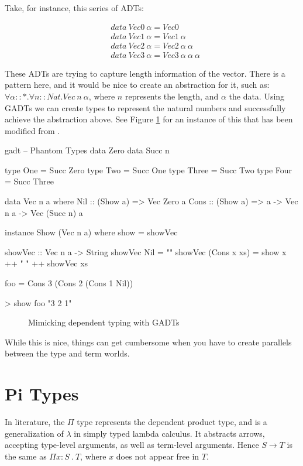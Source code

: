 Take, for instance, this series of ADTs:
\begin{spacing}{1.3}
\begin{equation*}
  \begin{aligned}
  & data\ Vec0\ \alpha = Vec0 \\
  & data\ Vec1\ \alpha = Vec1\ \alpha \\
  & data\ Vec2\ \alpha = Vec2\ \alpha\ \alpha \\
  & data\ Vec3\ \alpha = Vec3\ \alpha\ \alpha\ \alpha
  \end{aligned}
\end{equation*}
\end{spacing}

These ADTs are trying to capture length information of the vector. There is a pattern here, and it would be nice to create an abstraction for it, such as: $\forall \alpha :: \ast.\forall n :: Nat.Vec\ n\ \alpha $, where $n$ represents the length, and $\alpha $ the data.\cite{lambdaPi} Using GADTs we can create types to represent the natural numbers and successfully achieve the abstraction above. See Figure \ref{fig:gadt} for an instance of this that has been modified from \cite{vectors}.

\begin{SaveVerbatim}{gadt}
-- Phantom Types
data Zero
data Succ n

type One   = Succ Zero
type Two   = Succ One
type Three = Succ Two
type Four  = Succ Three

data Vec n a where
  Nil  :: (Show a) =>                 Vec Zero a
  Cons :: (Show a) => a -> Vec n a -> Vec (Succ n) a

instance Show (Vec n a) where show = showVec

showVec :: Vec n a -> String
showVec Nil = ""
showVec (Cons x xs) = show x ++ " " ++ showVec xs

foo = Cons 3 (Cons 2 (Cons 1 Nil))

> show foo
"3 2 1"
\end{SaveVerbatim}
\begin{figure}
  \caption{Mimicking dependent typing with GADTs}
  \label{fig:gadt}
\end{figure}


While this is nice, things can get cumbersome when you have to create parallels between the type and term worlds.

\section{Pi Types}
In literature, the $\Pi $ type represents the dependent product type, and is a generalization of $\lambda $ in simply typed lambda calculus. It abstracts arrows, accepting type-level arguments, as well as term-level arguments. Hence $S \rightarrow T  $ is the same as $\Pi x : S\ .\ T $, where $x$ does not appear free in $T$.

